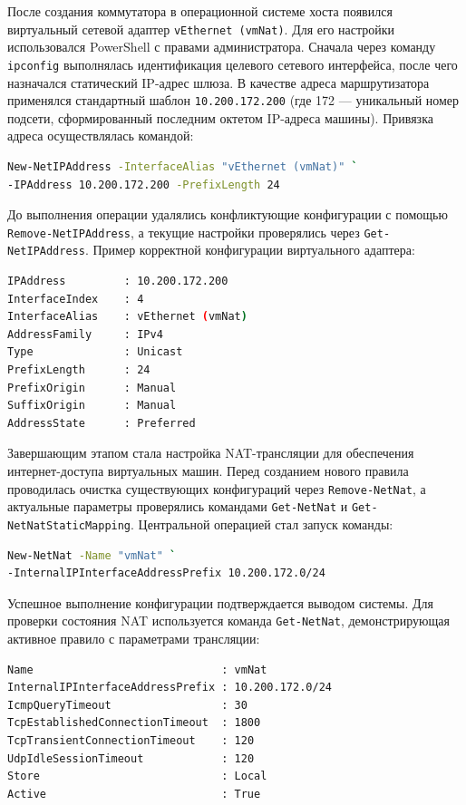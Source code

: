\documentclass[areaset=advanced]{scrartcl}
\begin{document}
После создания коммутатора в операционной системе хоста появился виртуальный сетевой адаптер \texttt{vEthernet (vmNat)}. Для его настройки использовался PowerShell с правами администратора. Сначала через команду \texttt{ipconfig} выполнялась идентификация целевого сетевого интерфейса, после чего назначался статический IP-адрес шлюза. В качестве адреса маршрутизатора применялся стандартный шаблон \texttt{10.200.172.200} (где 172 — уникальный номер подсети, сформированный последним октетом IP-адреса машины). Привязка адреса осуществлялась командой:

\begin{lstlisting}[language=bash]
New-NetIPAddress -InterfaceAlias "vEthernet (vmNat)" `
-IPAddress 10.200.172.200 -PrefixLength 24
\end{lstlisting}

До выполнения операции удалялись конфликтующие конфигурации с помощью \texttt{Remove-NetIPAddress}, а текущие настройки проверялись через \texttt{Get-NetIPAddress}. Пример корректной конфигурации виртуального адаптера:

\begin{lstlisting}[language=bash]
IPAddress         : 10.200.172.200
InterfaceIndex    : 4
InterfaceAlias    : vEthernet (vmNat)
AddressFamily     : IPv4
Type              : Unicast
PrefixLength      : 24
PrefixOrigin      : Manual
SuffixOrigin      : Manual
AddressState      : Preferred
\end{lstlisting}

Завершающим этапом стала настройка NAT-трансляции для обеспечения интернет-доступа виртуальных машин. Перед созданием нового правила проводилась очистка существующих конфигураций через \texttt{Remove-NetNat}, а актуальные параметры проверялись командами \texttt{Get-NetNat} и \texttt{Get-NetNatStaticMapping}. Центральной операцией стал запуск команды:

\begin{lstlisting}[language=bash]
New-NetNat -Name "vmNat" `
-InternalIPInterfaceAddressPrefix 10.200.172.0/24
\end{lstlisting}

Успешное выполнение конфигурации подтверждается выводом системы. Для проверки состояния NAT используется команда \texttt{Get-NetNat}, демонстрирующая активное правило с параметрами трансляции:

\begin{lstlisting}[language=bash]
Name                             : vmNat
InternalIPInterfaceAddressPrefix : 10.200.172.0/24
IcmpQueryTimeout                 : 30
TcpEstablishedConnectionTimeout  : 1800
TcpTransientConnectionTimeout    : 120
UdpIdleSessionTimeout            : 120
Store                            : Local
Active                           : True
\end{lstlisting}
\end{document}
